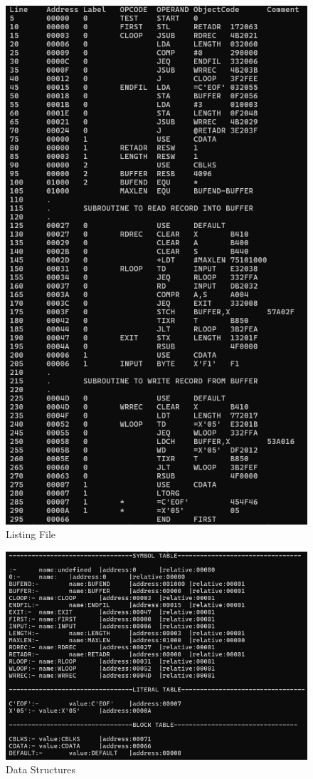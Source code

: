 \documentclass[
]{article}
\begin{document}
\begin{figure}[H]
\centering
\includegraphics{img/image-6.png}
\caption{Listing File}
\end{figure}

\begin{figure}[H]
\centering
\includegraphics{img/image-7.png}
\caption{Data Structures}
\end{figure}
\end{document}
